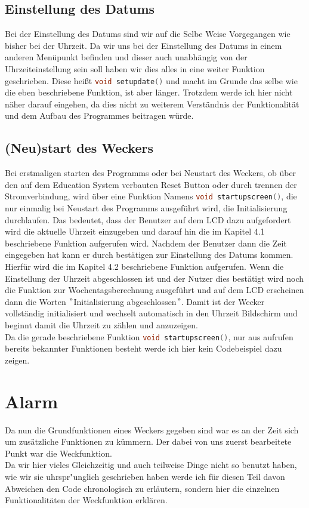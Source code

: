 \documentclass[openright,twoside,11pt,a4paper]{scrartcl}
\begin{document}
\begin{flushleft}
	 	\subsection{Einstellung des Datums}
	 	Bei der Einstellung des Datums sind wir auf die Selbe Weise Vorgegangen wie bisher bei der Uhrzeit. Da wir uns bei der Einstellung des Datums in einem anderen Menüpunkt befinden und dieser auch unabhängig von der Uhrzeiteinstellung sein soll haben wir dies alles in eine weiter Funktion geschrieben. Diese heißt \lstinline[language=c++,]|void setupdate()| und macht im Grunde das selbe wie die eben beschriebene Funktion, ist aber länger. Trotzdem werde ich hier nicht näher darauf eingehen, da dies nicht zu weiterem Verständnis der Funktionalität und dem Aufbau des Programmes beitragen würde.
	 	\subsection{(Neu)start des Weckers}
	 	Bei erstmaligen starten des Programms oder bei Neustart des Weckers, ob über den auf dem Education System verbauten Reset Button oder durch trennen der Stromverbindung, wird über eine Funktion Namens \lstinline[language=c++]|void startupscreen()|, die nur einmalig bei Neustart des Programms ausgeführt wird, die Initialisierung durchlaufen. Das bedeutet, dass der Benutzer auf dem LCD dazu aufgefordert wird die aktuelle Uhrzeit einzugeben und darauf hin die im Kapitel 4.1 beschriebene Funktion aufgerufen wird. Nachdem der Benutzer dann die Zeit eingegeben hat kann er durch bestätigen zur Einstellung des Datums kommen. Hierfür wird die im Kapitel 4.2 beschriebene Funktion aufgerufen. Wenn die Einstellung der Uhrzeit abgeschlossen ist und der Nutzer dies bestätigt wird noch die Funktion zur Wochentagsberechnung ausgeführt und auf dem LCD erscheinen dann die Worten $"$Initialisierung abgeschlossen$"$. Damit ist der Wecker vollständig initialisiert und wechselt automatisch in den Uhrzeit Bildschirm und beginnt damit die Uhrzeit zu zählen und anzuzeigen. \\
	 	Da die gerade beschriebene Funktion \lstinline[language=c++]|void startupscreen()|, nur aus aufrufen bereits bekannter Funktionen besteht werde ich hier kein Codebeispiel dazu zeigen. \\
	 	\section{Alarm}
	 	Da nun die Grundfunktionen eines Weckers gegeben sind war es an der Zeit sich um zusätzliche Funktionen zu kümmern. Der dabei von uns zuerst bearbeitete Punkt war die Weckfunktion. \\
	 	Da wir hier vieles Gleichzeitig und auch teilweise Dinge nicht so benutzt haben, wie wir sie uhrspr"unglich geschrieben haben werde ich für diesen Teil davon Abweichen den Code chronologisch zu erläutern, sondern hier die einzelnen Funktionalitäten der Weckfunktion erklären. 

\end{flushleft}
\end{document}
